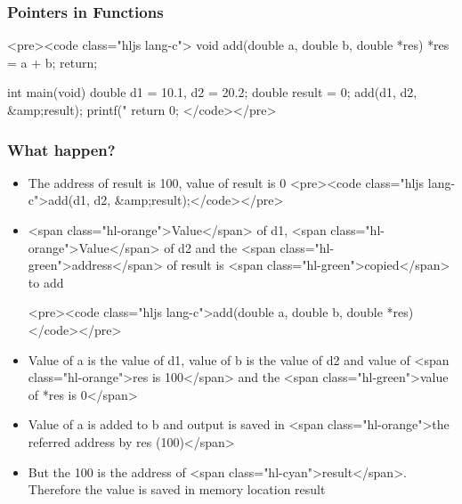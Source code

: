 \documentclass{../c-lecture}
\begin{document}
\begin{frame}
  \begin{frame}
    \frametitle{Pointers in Functions}
    <pre><code class="hljs lang-c">
void add(double a, double b, double *res) {
  *res = a + b;
  return;
}

int main(void) {
  double d1 = 10.1, d2 = 20.2;
  double result = 0;
  add(d1, d2, &amp;result);
  printf("%
  return 0;
}
    </code></pre>
  \end{frame}
  \begin{frame}
    \frametitle{What happen?}
    \begin{itemize}
      <pre><code class="hljs lang-c">double result = 0;</code></pre>
      \item The address of result is 100, value of result is 0
      <pre><code class="hljs lang-c">add(d1, d2, &amp;result);</code></pre>
      \item
        <span class="hl-orange">Value</span> of d1,
        <span class="hl-orange">Value</span> of d2 and the
        <span class="hl-green">address</span> of result is
        <span class="hl-green">copied</span> to add

      <pre><code class="hljs lang-c">add(double a, double b, double *res)</code></pre>
      \item
        Value of a is the value of d1, value of b is the value of d2 and value
        of <span class="hl-orange">res is 100</span> and the
        <span class="hl-green">value of *res is 0</span>

    \end{itemize}
  \end{frame}
  \begin{frame}
    \begin{itemize}
      <pre><code class="hljs lang-c">*res = a + b;</code></pre>
      \item
        Value of a is added to b and output is saved in
        <span class="hl-orange">the referred address by res (100)</span>

      \item
        But the 100 is the address of <span class="hl-cyan">result</span>.
        Therefore the value is saved in memory location result

    \end{itemize}
  \end{frame}
\end{frame}
\end{document}
